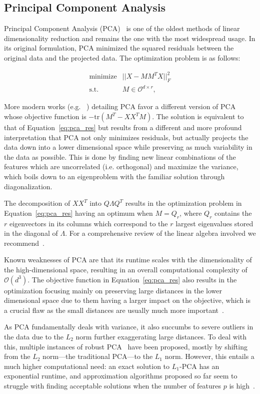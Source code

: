 \subsection{Principal Component Analysis}

Principal Component Analysis (PCA)~\cite{pearson_pca} is one of the oldest methods of linear dimensionality
reduction and remains the one with the most widespread usage. In its original formulation,
PCA minimized the squared residuals between the original data and the projected data. The
optimization problem is as follows:

\begin{eqnarray}
    \text{minimize} & || X - MM^TX ||_F^2 \\
    \text{s.t.} & M \in \mathcal{O}^{d \times r},
    \label{eq:pca_res}
\end{eqnarray}

More modern works (e.g. ~\cite{bishop}) detailing PCA favor a different version
of PCA whose objective function is $-\text{tr}(M^T - XX^T M)$. The solution is
equivalent to that of Equation~\ref{eq:pca_res} but results from a different
and more profound interpretation that PCA not only minimizes residuals, but
actually projects the data down into a lower dimensional space while preserving
as much variability in the data as possible. This is done by finding new linear
combinations of the features which are uncorrelated (i.e. orthogonal) and
maximize the variance, which boils down to an eigenproblem with the familiar
solution through diagonalization.

The decomposition of $XX^T$ into $Q \Lambda Q^T$ results in the optimization
problem in Equation~\ref{eq:pca_res} having an optimum when $M = Q_r$, where
$Q_r$ contains the $r$ eigenvectors in its columns which correspond to the $r$
largest eigenvalues stored in the diagonal of $\Lambda$. For a comprehensive
review of the linear algebra involved we recommend~\cite{pca_tut}.

Known weaknesses of PCA are that its runtime scales with the dimensionality of the
high-dimensional space, resulting in an overall computational complexity of $\mathcal{O}(d^3)$.  The objective function
in Equation~\ref{eq:pca_res} also results in the optimization focusing mainly on
preserving large distances in the lower dimensional space due to them having a
larger impact on the objective, which is a crucial flaw as the small distances
are usually much more important~\cite{vandermaaten_review}.

As PCA fundamentally deals with variance, it also succumbs to severe outliers
in the data due to the $L_2$ norm further exaggerating large distances. To deal
with this, multiple instances of robust PCA~\cite{robust_pca_pp_li_chen,robust_pca_galpin,
robust_pca_gao,r1_pca, pca_pp,robust_pca_candes,linearsurvey} have been proposed, mostly by shifting from the
$L_2$ norm---the traditional PCA---to the $L_1$ norm. However, this entails a
much higher computational need: an exact solution to $L_1$-PCA has an
exponential runtime, and approximation algorithms proposed so far seem to
struggle with finding acceptable solutions when the number of features $p$ is
high~\cite{pca_pp}.

